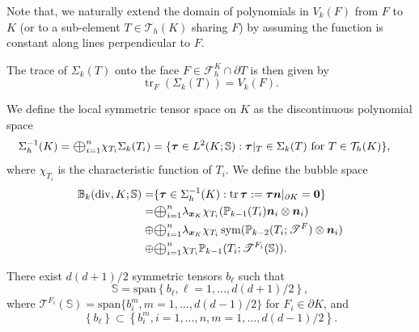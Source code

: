 \documentclass[review,hidelinks,onefignum,onetabnum]{siamart251216}
\renewcommand{\div}{\operatorname{div}}
\newcommand{\Oplus}{\ensuremath{\vcenter{\hbox{\scalebox{1.5}{$\oplus$}}}}}
\newcommand{\tr}{\operatorname{tr}}
\newcommand{\sym}{\operatorname{sym}}
\begin{document}
Note that, we naturally extend the domain of polynomials in $V_{k}(F)$ from $F$ to $K$ (or to a sub-element $T\in\mathcal T_h(K)$ sharing $F$) by assuming the function is constant along lines perpendicular to $F$. 


The trace of $\Sigma_k(T)$ onto the face $F\in\mathcal{F}_h^{K}\cap \partial T$ is then given by
\begin{equation*}
\tr_F(\Sigma_k(T))=V_{k}(F). 
\end{equation*}


We define the local symmetric tensor space on $K$ as the discontinuous polynomial space
\begin{align}\label{eq:202411132}
\Sigma_h^{-1}(K)&=\Oplus_{i=1}^n\chi_{T_i}\Sigma_k(T_i)=\{\boldsymbol{\tau}\in L^2(K;\mathbb S): \boldsymbol{\tau}|_T\in \Sigma_k(T) \textrm{ for }T\in\mathcal{T}_h(K)\},
\end{align}
where $\chi_{T_i}$ is the characteristic function of $T_i$. We  define the bubble space
\begin{equation}
\begin{aligned}
\mathbb{B}_k(\div,K;\mathbb{S})=&\{\boldsymbol{\tau}\in \Sigma_h^{-1}(K): \tr\boldsymbol{\tau} :=\boldsymbol{\tau}\boldsymbol{n}|_{\partial K}=\boldsymbol{0}\}\\
=&\Oplus_{i=1}^n\lambda_{\boldsymbol{x}_K}\chi_{T_i}(\mathbb{P}_{k-1}(T_i)\boldsymbol{n}_i\otimes\boldsymbol{n}_i) \\
\oplus
&\Oplus_{i=1}^n\lambda_{\boldsymbol{x}_K}\chi_{T_i}\sym(\mathbb{P}_{k-2}(T_i; \mathscr T^F)\otimes\boldsymbol{n}_i) \\
\oplus 
&\Oplus_{i=1}^n\chi_{T_i}\mathbb{P}_{k-1}(T_i;\mathscr T^{F_i}(\mathbb S)).
\end{aligned}
\end{equation}

 \begin{assumption}\label{meshassumption}
There exist $d(d+1)/2$ symmetric tensors $b_\ell$ such that
\begin{equation}
\mathbb{S}=\text{span}\left\{ b_{\ell}, \ell=1,\ldots,d(d+1)/2\right\},\label{equ_assumption_ddpolytope}
\end{equation}
where $\mathscr T^{F_i}(\mathbb S)=\textrm{span}\{ b_i^{m}, m=1,\ldots,d(d-1)/2\}$ for $F_i\in \partial K$, and 
\begin{equation}
\left\{ b_\ell\right\} \subset \left\{ b_i^m, i=1,\ldots,n, m=1,\ldots,d(d-1)/2\right\}.\label{equ_edge_vector_property}
\end{equation}
\end{assumption}
\end{document}
